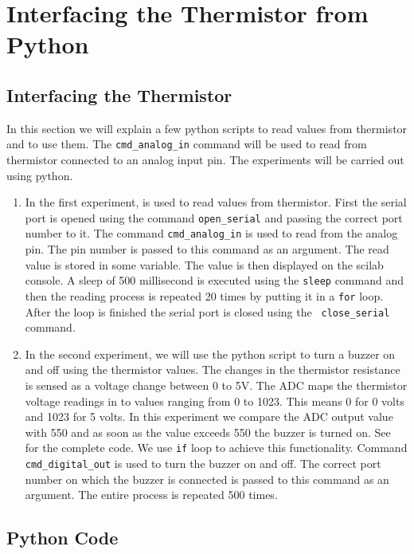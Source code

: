 \section{Interfacing the Thermistor from Python}
\subsection{Interfacing the Thermistor}
In this section we will explain a few python scripts to read values
from thermistor and to use them.  The {\tt cmd\_analog\_in} command
will be used to read from thermistor connected to an analog input
pin. The experiments will be carried out using python.

\begin{enumerate}
\item In the first experiment,  is used to read
  values from thermistor. First the serial port is opened using the
  command {\tt open\_serial} and passing the correct port number to
  it. The command {\tt cmd\_analog\_in} is used to read from the
  analog pin. The pin number is passed to this command as an
  argument. The read value is stored in some variable. The value is
  then displayed on the scilab console. A sleep of 500 millisecond is
  executed using the {\tt sleep} command and then the reading process
  is repeated 20 times by putting it in a {\tt for} loop. After the
  loop is finished the serial port is closed using the {\tt
    close\_serial} command.

\item In the second experiment, we will use the python script to
  turn a buzzer on and off using the thermistor values. The changes in
  the thermistor resistance is sensed as a voltage change between 0 to
  5V. The ADC maps the thermistor voltage readings in to values
  ranging from 0 to 1023. This means 0 for 0 volts and 1023 for 5
  volts. In this experiment we compare the ADC output value with 550
  and as soon as the value exceeds 550 the buzzer is turned on. See
   for the complete code. We use {\tt if}
  loop to achieve this functionality. Command {\tt cmd\_digital\_out}
  is used to turn the buzzer on and off.  The correct port number on
  which the buzzer is connected is passed to this command as an
  argument. The entire process is repeated 500 times.
\end{enumerate}

\subsection{Python Code}
\label{sec:therm-pyhton-code}

